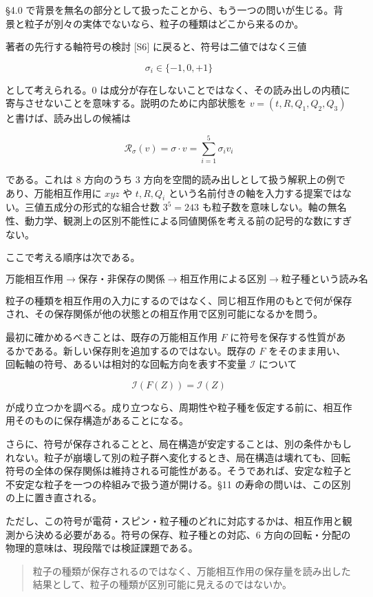 \documentclass[
  a4paper,
]{ltjsarticle}
\begin{document}
§4.0
で背景を無名の部分として扱ったことから、もう一つの問いが生じる。背景と粒子が別々の実体でないなら、粒子の種類はどこから来るのか。

著者の先行する軸符号の検討 {[}S6{]} に戻ると、符号は二値ではなく三値

\[
\sigma_i\in\{-1,0,+1\}
\]

として考えられる。\(0\)
は成分が存在しないことではなく、その読み出しの内積に寄与させないことを意味する。説明のために内部状態を
\(v=(t,R,Q_1,Q_2,Q_3)\) と書けば、読み出しの候補は

\[
\mathcal R_\sigma(v)=\sigma\cdot v=\sum_{i=1}^{5}\sigma_iv_i
\]

である。これは 8 方向のうち 3
方向を空間的読み出しとして扱う解釈上の例であり、万能相互作用に \(xyz\)
や \(t,R,Q_i\)
という名前付きの軸を入力する提案ではない。三値五成分の形式的な組合せ数
\(3^5=243\)
も粒子数を意味しない。軸の無名性、動力学、観測上の区別不能性による同値関係を考える前の記号的な数にすぎない。

ここで考える順序は次である。

\[
\boxed{
\text{万能相互作用}
\longrightarrow
\text{保存・非保存の関係}
\longrightarrow
\text{相互作用による区別}
\longrightarrow
\text{粒子種という読み名}
}
\]

粒子の種類を相互作用の入力にするのではなく、同じ相互作用のもとで何が保存され、その保存関係が他の状態との相互作用で区別可能になるかを問う。

最初に確かめるべきことは、既存の万能相互作用 \(F\)
に符号を保存する性質があるかである。新しい保存則を追加するのではない。既存の
\(F\) をそのまま用い、回転軸の符号、あるいは相対的な回転方向を表す不変量
\(\mathcal I\) について

\[
\boxed{\mathcal I(F(Z))=\mathcal I(Z)}
\]

が成り立つかを調べる。成り立つなら、周期性や粒子種を仮定する前に、相互作用そのものに保存構造があることになる。

さらに、符号が保存されることと、局在構造が安定することは、別の条件かもしれない。粒子が崩壊して別の粒子群へ変化するとき、局在構造は壊れても、回転符号の全体の保存関係は維持される可能性がある。そうであれば、安定な粒子と不安定な粒子を一つの枠組みで扱う道が開ける。§11
の寿命の問いは、この区別の上に置き直される。

ただし、この符号が電荷・スピン・粒子種のどれに対応するかは、相互作用と観測から決める必要がある。符号の保存、粒子種との対応、6
方向の回転・分配の物理的意味は、現段階では検証課題である。

\begin{quote}
粒子の種類が保存されるのではなく、万能相互作用の保存量を読み出した結果として、粒子の種類が区別可能に見えるのではないか。
\end{quote}
\end{document}
